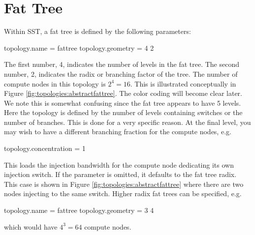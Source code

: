 
\section{Fat Tree}
\label{sec:tutorial:fattree}

Within SST, a fat tree is defined by the following parameters:

\begin{ViFile}
topology.name = fattree
topology.geometry = 4 2
\end{ViFile}
The first number, 4, indicates the number of levels in the fat tree.
The second number, 2, indicates the radix or branching factor of the tree.
The number of compute nodes in this topology is $2^4 = 16$.
This is illustrated conceptually in Figure \ref{fig:topologies:abstractfattree}.
The color coding will become clear later.
We note this is somewhat confusing since the fat tree appears to have 5 levels.
Here the topology is defined by the number of levels containing switches or the number of branches.
This is done for a very specific reason.  
At the final level, you may wish to have a different branching fraction for the compute nodes, e.g.

\begin{ViFile}
topology.concentration = 1
\end{ViFile}
This loads the injection bandwidth for the compute node dedicating its own injection switch.
If the parameter  is omitted, it defaults to the fat tree radix.
This case is shown in Figure \ref{fig:topologies:abstractfattree} where there are two nodes injecting to the same switch.
Higher radix fat trees can be specified, e.g.

\begin{ViFile}
topology.name = fattree
topology.geometry = 3 4
\end{ViFile}
which would have $4^3 = 64$ compute nodes.

